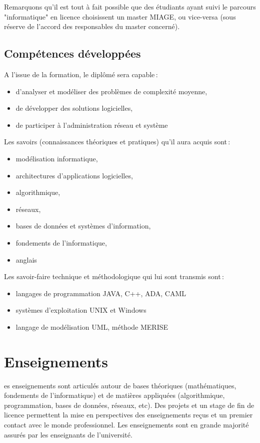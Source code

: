 \documentclass[10pt, a5paper]{report}
\begin{document}
\begin{spacing}{1.5}
Remarquons qu'il est tout à fait possible que des étudiants ayant suivi le parcours "informatique" en licence choisissent un master MIAGE, ou vice-versa (sous réserve de l'accord des responsables du master concerné).

\subsection*{Compétences développées}

A l’issue de la formation, le diplômé sera capable\,:

\begin{itemize}
\item d'analyser et modéliser des problèmes de complexité moyenne,
\item de développer des solutions logicielles,
\item de participer à l'administration réseau et système
\end{itemize}

Les savoirs (connaissances théoriques et pratiques) qu'il aura acquis sont\,:
\begin{itemize}
\item modélisation informatique,
\item architectures d'applications logicielles,
\item algorithmique,
\item réseaux,
\item bases de données et systèmes d'information,
\item fondements de l'informatique,
\item anglais
\end{itemize}

Les savoir-faire technique et méthodologique qui lui sont transmis sont\,:
\begin{itemize}
\item langages de programmation JAVA, C++, ADA, CAML
\item systèmes d'exploitation UNIX et Windows
\item langage de modélisation UML, méthode MERISE
\end{itemize}


\section*{Enseignements}
es enseignements sont articulés autour de bases théoriques (mathématiques, fondements de l'informatique) et de matières appliquées (algorithmique, programmation, bases de données, réseaux, etc). Des projets et un stage de fin de licence permettent la mise en perspectives des enseignements reçus et un premier contact avec le monde professionnel.
Les enseignements sont en grande majorité assurés par les enseignants de l'université.


\end{spacing}
\end{document}
